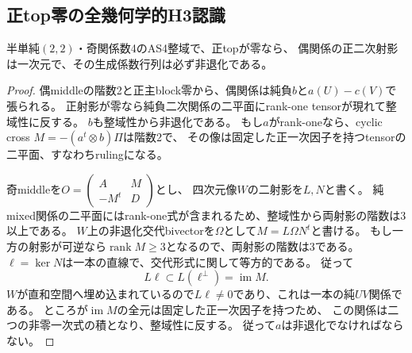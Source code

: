 \subsection{正top零の全幾何学的H3認識}
\label{subsec:h3-order2-22-Pzero-nondegenerate}
\begin{lemma}
\label{lem:h3-order2-22-Pzero-rank1-impossible}
半単純$(2,2)$・奇関係数4のAS4整域で、正topが零なら、
偶関係の正二次射影は一次元で、その生成係数行列は必ず非退化である。
\end{lemma}
\begin{proof}
偶middleの階数2と正主block零から、偶関係は純負$b$と$a(U)-c(V)$で張られる。
正射影が零なら純負二次関係の二平面にrank-one tensorが現れて整域性に反する。
$b$も整域性から非退化である。
もし$a$がrank-oneなら、cyclic cross $M=-(a^t\otimes b)\Pi$は階数2で、
その像は固定した正一次因子を持つtensorの二平面、すなわちrulingになる。

奇middleを$O=\left(\begin{smallmatrix}A&M\\-M^t&D\end{smallmatrix}\right)$とし、
四次元像$W$の二射影を$L,N$と書く。
純mixed関係の二平面にはrank-one式が含まれるため、整域性から両射影の階数は3以上である。
$W$上の非退化交代bivectorを$\Omega$として$M=L\Omega N^t$と書ける。
もし一方の射影が可逆なら$\operatorname{rank}M\ge3$となるので、両射影の階数は3である。
$\ell=\ker N$は一本の直線で、交代形式に関して等方的である。
従って
\[
 L\ell\subset L(\ell^\perp)=\operatorname{im}M.
\]
$W$が直和空間へ埋め込まれているので$L\ell\ne0$であり、これは一本の純$UV$関係である。
ところが$\operatorname{im}M$の全元は固定した正一次因子を持つため、
この関係は二つの非零一次式の積となり、整域性に反する。
従って$a$は非退化でなければならない。
\end{proof}

